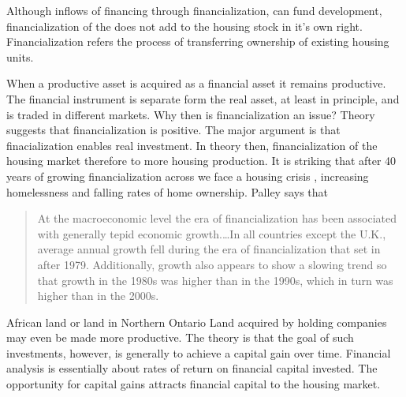 \documentclass[a4paper]{article}
\theoremstyle{definition}
\theoremstyle{plain}
\begin{document}
{Although inflows of financing through financialization, can fund development, financialization of the does not add to the housing stock in it's own right. Financialization refers the process of transferring ownership of existing housing units. 

When  a productive asset is acquired as a financial asset it remains productive.  The financial instrument is separate form the real asset, at least in principle, and is traded in different markets. Why then is financialization an issue?  Theory suggests that financialization is positive.  The major argument is that finacialization enables real investment. In theory then, financialization of the housing market therefore  to more housing production. It is striking that after 40 years of growing financialization across we face a housing crisis , increasing homelessness and falling rates of home ownership.  Palley \cite{palleyFinancializationWhatIt2007} says that 

\begin{quotation}At the macroeconomic level the era of financialization has been associated with generally tepid economic growth.\dots  In all countries except the U.K., average annual growth fell during the era of financialization that set in after 1979. Additionally, growth also appears to show a slowing trend so that growth in the 1980s was higher than in the 1990s, which in turn was higher than in the 2000s. \end{quotation}

African land or land in Northern Ontario 
Land acquired by holding companies may even be made more productive. The theory is that 
the goal of such investments, however, is generally to achieve a capital gain over time. Financial analysis is essentially about rates of return on financial capital invested. The opportunity for capital gains  attracts financial capital to the housing market.%

}
\end{document}
